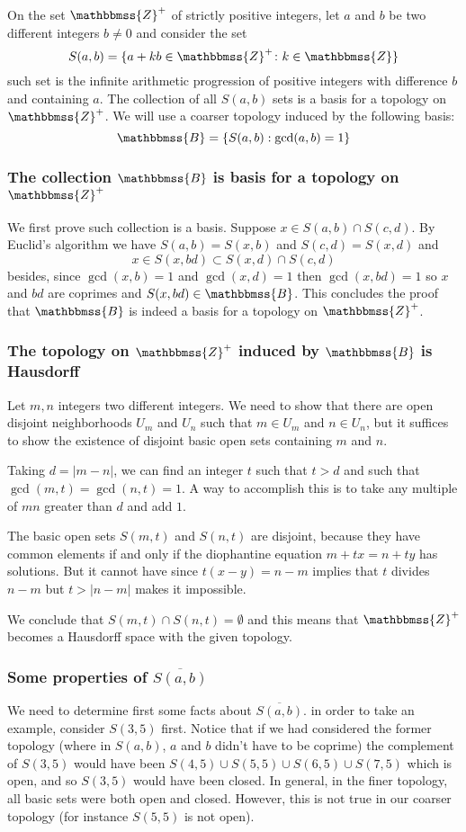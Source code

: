 \documentclass[12pt]{article}
\newcommand{\Z}{\mathbbmss{Z}}
\newcommand{\B}{\mathbbmss{B}}
\newcommand{\mathbb}[1]{\mathbbmss{#1}}
\begin{document}
On the set $\Z^+$ of strictly 
positive integers, let $a$ and $b$ be two different integers $b\neq0$ and consider the set
\[ S(a,b)=\{a+kb\in \Z^+ \colon k\in \Z\}\]
such set is the infinite arithmetic progression of positive integers with difference $b$ and containing $a$.
The collection of all $S(a,b)$ sets is a basis for a topology on $\Z^+$. We will use a coarser topology induced by the following basis:
\[\mathbb{B}=\{S(a,b): \gcd(a,b)=1\}\]

\subsubsection*{The collection $\B$ is basis for a topology on $\Z^+$}
We first prove such collection is a basis. 
Suppose $x\in S(a,b)\cap S(c,d)$. By Euclid's algorithm we have $S(a,b)=S(x,b)$ and $S(c,d)=S(x,d)$ and 
\[ 
x\in S(x,bd)\subset S(x,d)\cap S(c,d)
\]
besides, since $\gcd(x,b)=1$ and $\gcd(x,d)=1$ then $\gcd(x,bd)=1$ so $x$ and $bd$ are coprimes and $S(x,bd)\in \mathbb{B}$. This concludes the proof that $\B$ is indeed a basis for a topology on $\Z^+$.

\subsubsection*{The topology on $\Z^+$ induced by $\B$ is Hausdorff}
Let $m,n$ integers two different integers.
We need to show that there are open disjoint neighborhoods $U_m$ and $U_n$ such that $m\in U_m$ and $n\in U_n$, but it suffices to show the existence of disjoint basic open sets containing $m$ and $n$.

Taking $d=|m-n|$,  we can find an integer $t$ such that $t>d$ and such that
$\gcd(m,t)=\gcd(n,t)=1$. A way to accomplish this is to take any multiple of $mn$ greater than $d$ and add $1$.

The basic open sets $S(m,t)$ and $S(n,t)$ are disjoint, because they have common elements if and only if the diophantine equation $m+tx = n+ty$ has solutions. But it cannot have since $t(x-y) = n-m$ implies that $t$ divides $n-m$ but $t>|n-m|$ makes it impossible.

We conclude that $S(m,t)\cap S(n,t)=\emptyset$ and this means that $\Z^+$ becomes a Hausdorff space with the given topology.

\subsubsection*{Some properties of $\overline{S(a,b)}$}
We need to determine first some facts about $\overline{S(a,b)}$. in order to take an example, consider $S(3,5)$ first. Notice that if we had considered the former topology (where in $S(a,b)$, $a$ and $b$ didn't have to be coprime) the complement of $S(3,5)$ would have been $S(4,5)\cup S(5,5)\cup S(6,5)\cup S(7,5)$ which is open, and so $S(3,5)$ would have been closed. In general, in the finer topology, all basic sets were both open and closed. However, this is not true in our coarser topology (for instance $S(5,5)$ is not open). 
\end{document}
